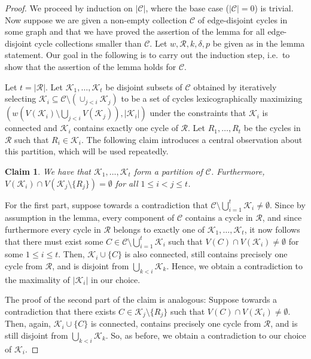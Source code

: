 \documentclass[11pt,reqno]{article}
\newtheorem{claim}[theorem]{Claim}
\newenvironment{claimproof}[1][\proofname]{\proof[#1]\renewcommand{\qedsymbol}{$\blacksquare$}}{\endproof}
\begin{document}
\begin{proof}
     We proceed by induction on $|\mathcal C|$, where the base case ($|\mathcal C|=0$) is trivial. Now suppose we are given a non-empty collection $\mathcal{C}$ of edge-disjoint cycles in some graph and that we have proved the assertion of the lemma for all edge-disjoint cycle collections smaller than $\mathcal{C}$. Let $w,\mathcal{R},k,\delta,p$ be given as in the lemma statement. Our goal in the following is to carry out the induction step, i.e.\ to show that the assertion of the lemma holds for $\mathcal{C}$.

     Let $t=|\mathcal R|$. Let $\mathcal K_1,\ldots,\mathcal K_t$ be disjoint subsets of $\mathcal C$ obtained by iteratively selecting $\mathcal K_i\subseteq \mathcal C\setminus(\cup_{j<i}\mathcal K_j)$ to be a set of cycles lexicographically maximizing $(w(V(\mathcal K_i)\setminus \bigcup_{j<i}V(\mathcal{K}_j)),|\mathcal K_i|)$ under the constraints that $\mathcal K_i$ is connected and $\mathcal K_i$ contains exactly one cycle of $\mathcal R$. Let $R_1,\ldots, R_t$ be the cycles in $\mathcal R$ such that $R_i\in \mathcal K_i$. The following claim introduces a central observation about this partition, which will be used repeatedly.
     \begin{claim}\label{clm: disjointness}
     We have that $\mathcal{K}_1,\ldots,\mathcal{K}_t$ form a partition of $\mathcal C$. Furthermore,  $V(\mathcal K_i)\cap V(\mathcal K_j\setminus \{R_j\})=\emptyset$ for all $1\le i<j\le t$.
     \end{claim}
     \begin{claimproof}
For the first part, suppose towards a contradiction that $\mathcal C\setminus \bigcup_{i=1}^t \mathcal K_i\neq \emptyset$. Since by assumption in the lemma, every component of $\mathcal C$ contains a cycle in $\mathcal R$, and since furthermore every cycle in $\mathcal R$ belongs to exactly one of $\mathcal K_1,\ldots,\mathcal K_t$, it now follows that there must exist some $C\in \mathcal C\setminus \bigcup_{i=1}^t \mathcal K_i$ such that $V(C)\cap V(\mathcal K_i)\neq \emptyset$ for some $1\le i \le t$. Then, $\mathcal{K}_i\cup \{C\}$ is also connected, still contains precisely one cycle from $\mathcal R$, and is disjoint from $\bigcup_{k<i}\mathcal K_k$. Hence, we obtain a contradiction to the maximality of $|\mathcal K_i|$ in our choice. 

The proof of the second part of the claim is analogous:
 Suppose towards a contradiction that there exists $C\in \mathcal K_j\setminus\{R_j\}$ such that $V(C)\cap V(\mathcal K_i)\neq \emptyset$. Then, again, $\mathcal K_i\cup \{C\}$ is connected, contains precisely one cycle from $\mathcal{R}$, and is still disjoint from $\bigcup_{k<i}\mathcal{K}_k$. So, as before, we obtain a contradiction to our choice of $\mathcal{K}_i$.
     \end{claimproof}


\end{proof}
\end{document}
